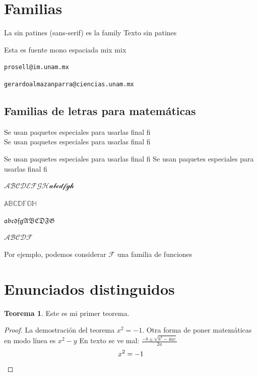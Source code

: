 \documentclass[10pt]{book}
\theoremstyle{definition}
\theoremstyle{theorem}
\newtheorem{teo}[defi]{Teorema}
\theoremstyle{remark}
\begin{document}
\section{Familias}\label{sec:familias}

La \textsf{sin patines} (sans-serif) es la family
{\sffamily Texto sin patines}

{\ttfamily Esta es fuente mono espaciada mix} mix

\texttt{prosell@im.unam.mx}

\texttt{gerardoalmazanparra@ciencias.unam.mx}


\subsection{Familias de letras para matemáticas}

Se usan paquetes especiales para usarlas final f{i}\\
Se usan paquetes especiales para usarlas final f{i}

\medskip

Se usan paquetes especiales para usarlas final f{i}
Se usan paquetes especiales para usarlas final f{i}



$\mathcal{ABCDEFGH abcdfgh}$ %

$\mathbb{ABCDFGH}$ %

$\mathfrak{abcdfg ABCDFG}$ %

$\mathscr{ABCDF}$ %

Por ejemplo, podemos considerar $\mathcal{F}$ una familia de funciones

\section{Enunciados distinguidos}

\begin{teo}
    Este es mi primer teorema.
\end{teo}
\begin{proof}
    La demostración del teorema $x^2=-1$. Otra forma de poner matemáticas en modo línea es \(x^2-y\) En texto se ve mal: $\frac{-b\pm\sqrt{b^2-4ac}}{2a}$
    \begin{equation*}
        x^2=-1 \qedhere
    \end{equation*}
\end{proof}
\end{document}
